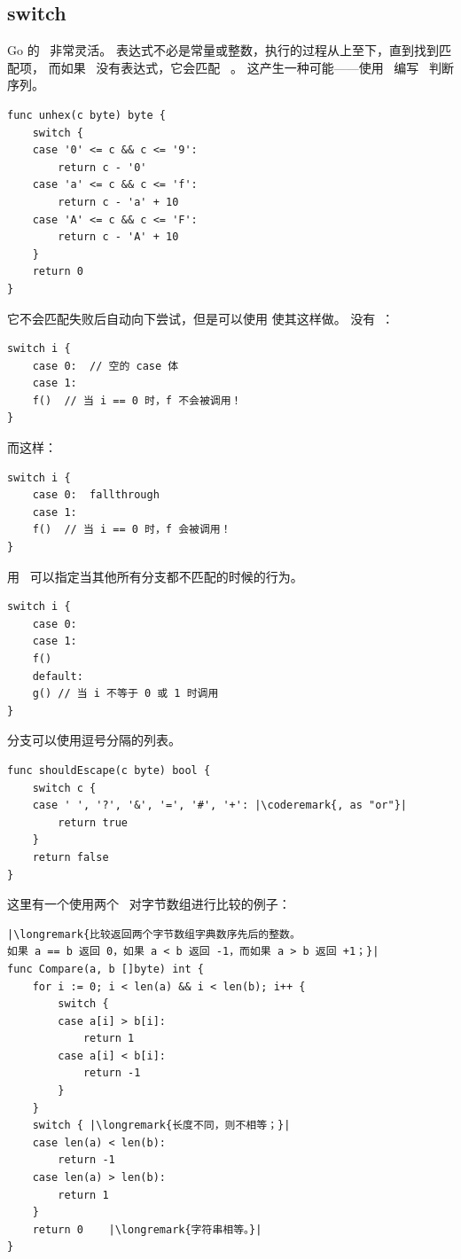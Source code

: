 \subsection{switch}
Go 的~ 非常灵活。
表达式不必是常量或整数，执行的过程从上至下，直到找到匹配项，
而如果~ 没有表达式，它会匹配~ 。
这产生一种可能——使用~ 编写~ 判断序列。
\begin{lstlisting}
func unhex(c byte) byte {
    switch {
    case '0' <= c && c <= '9':
        return c - '0'
    case 'a' <= c && c <= 'f':
        return c - 'a' + 10
    case 'A' <= c && c <= 'F':
        return c - 'A' + 10
    }
    return 0
}
\end{lstlisting}
它不会匹配失败后自动向下尝试，但是可以使用
使其这样做。
没有~：
\begin{lstlisting}
switch i {
    case 0:  // 空的 case 体
    case 1:
	f()  // 当 i == 0 时，f 不会被调用！
}
\end{lstlisting}
而这样：
\begin{lstlisting}
switch i {
    case 0:  fallthrough
    case 1:
	f()  // 当 i == 0 时，f 会被调用！
}
\end{lstlisting}
用~ 可以指定当其他所有分支都不匹配的时候的行为。
\begin{lstlisting}
switch i {
    case 0:  
    case 1:
	f()
    default:	
	g()	// 当 i 不等于 0 或 1 时调用
}
\end{lstlisting}
分支可以使用逗号分隔的列表。
\begin{lstlisting}
func shouldEscape(c byte) bool {
    switch c {
    case ' ', '?', '&', '=', '#', '+': |\coderemark{, as "or"}|
        return true
    }
    return false
}
\end{lstlisting}
这里有一个使用两个~ 对字节数组进行比较的例子：
\begin{lstlisting}
|\longremark{比较返回两个字节数组字典数序先后的整数。
如果 a == b 返回 0，如果 a < b 返回 -1，而如果 a > b 返回 +1；}|
func Compare(a, b []byte) int {
    for i := 0; i < len(a) && i < len(b); i++ {
        switch {
        case a[i] > b[i]:
            return 1
        case a[i] < b[i]:
            return -1
        }
    }
    switch { |\longremark{长度不同，则不相等；}|
    case len(a) < len(b):
        return -1
    case len(a) > len(b):
        return 1
    }
    return 0	|\longremark{字符串相等。}|
}
\end{lstlisting}
\showremarks


